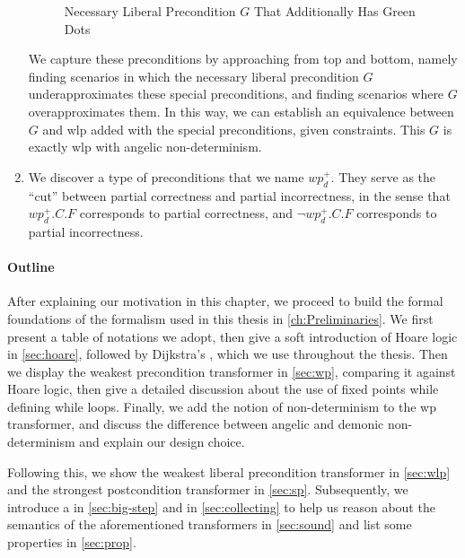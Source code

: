 \begin{enumerate}
\begin{figure}[t]
        \caption{Necessary Liberal Precondition $G$ That Additionally Has Green Dots}
        \label{fig:intro-g}
    \end{figure}
    We capture these preconditions by approaching from top and bottom, namely finding scenarios in which the necessary liberal precondition $G$ underapproximates these special preconditions, and finding scenarios where $G$ overapproximates them. In this way, we can establish an equivalence between $G$ and wlp added with the special preconditions, given constraints. This $G$ is exactly wlp with angelic non-determinism. 
    \item We discover a type of preconditions that we name $wp_d^+$. They serve as the ``cut'' between partial correctness and partial incorrectness, in the sense that $wp_d^+.C.F$ corresponds to partial correctness, and $\neg wp_d^+.C.F$ corresponds to partial incorrectness. 
\end{enumerate}


\paragraph{Outline}
After explaining our motivation in this chapter, we proceed to build the formal foundations of the formalism used in this thesis in \autoref{ch:Preliminaries}. 
We first present a table of notations we adopt, then give a soft introduction of Hoare logic in \autoref{sec:hoare}, followed by Dijkstra's , which we use throughout the thesis. 
Then we display the weakest precondition transformer in \autoref{sec:wp}, comparing it against Hoare logic, then give a detailed discussion about the use of fixed points while defining while loops. 
Finally, we add the notion of non-determinism to the wp transformer, and discuss the difference between angelic and demonic non-determinism and explain our design choice. 

Following this, we show the weakest liberal precondition transformer in \autoref{sec:wlp} and the strongest postcondition transformer in \autoref{sec:sp}. 
Subsequently, we introduce a  in \autoref{sec:big-step}  and  in \autoref{sec:collecting} to help us reason about the semantics of the aforementioned transformers in \autoref{sec:sound} and list some properties in \autoref{sec:prop}.

